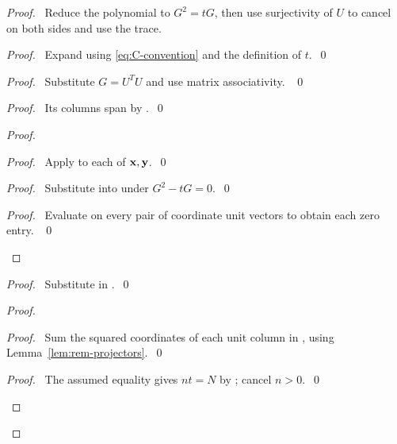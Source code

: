 \begin{proof}
\pfsketch\ Reduce the polynomial to $G^2=tG$, then use surjectivity of
$U$ to cancel on both sides and use the trace.
\begin{proof}\pf\ Expand using \eqref{eq:C-convention} and the definition
of $t$.~\qed\end{proof}
\begin{proof}\pf\ Substitute $G=U^TU$ and use matrix associativity. ~\qed\end{proof}
\begin{proof}\pf\ Its columns span by .~\qed\end{proof}
\begin{proof}
\begin{proof}\pf\ Apply  to each of ${\mathbf x},{\mathbf y}$.~\qed\end{proof}
\begin{proof}\pf\ Substitute  into 
under $G^2-tG=0$.~\qed\end{proof}
\qedstep
\begin{proof}\pf\ Evaluate  on every pair of
coordinate unit vectors to obtain each zero entry. ~\qed\end{proof}
\end{proof}
\begin{proof}\pf\ Substitute in .~\qed\end{proof}
\begin{proof}
\begin{proof}\pf\ Sum the squared coordinates of each unit column in
, using Lemma~\ref{lem:rem-projectors}.~\qed\end{proof}
\qedstep
\begin{proof}\pf\ The assumed equality gives $nt=N$ by
; cancel $n>0$.~\qed\end{proof}
\end{proof}
\end{proof}
